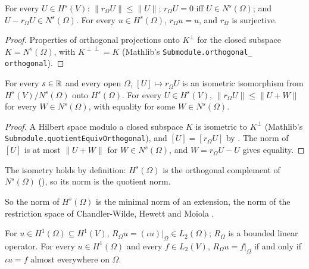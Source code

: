 \begin{lemma}
\label{lem:sobolev-restriction-basic}
\leanok
{}
For every $U \in H^s(V)$: $\|r_\Omega U\| \leq \|U\|$; $r_\Omega U = 0$ iff $U \in N^s(\Omega)$;
and $U - r_\Omega U \in N^s(\Omega)$. For every $u \in H^s(\Omega)$, $r_\Omega u = u$, and
$r_\Omega$ is surjective.
\end{lemma}

\begin{proof}
\leanok
Properties of orthogonal projections onto $K^\perp$ for the closed subspace $K = N^s(\Omega)$,
with $K^{\perp\perp} = K$ (Mathlib's \texttt{Submodule.\allowbreak orthogonal\_\allowbreak
orthogonal}).
\end{proof}

\begin{theorem}
\label{thm:sobolev-restriction-quotient}
\leanok
{}
For every $s \in \mathbb{R}$ and every open $\Omega$, $[U] \mapsto r_\Omega U$ is an isometric
isomorphism from $H^s(V) / N^s(\Omega)$ onto $H^s(\Omega)$. For every $U \in H^s(V)$,
$\|r_\Omega U\| \leq \|U + W\|$ for every $W \in N^s(\Omega)$, with equality for some
$W \in N^s(\Omega)$.
\end{theorem}

\begin{proof}
\leanok
A Hilbert space modulo a closed subspace $K$ is isometric to $K^\perp$ (Mathlib's
\texttt{Submodule.\allowbreak quotientEquivOrthogonal}), and $[U] = [r_\Omega U]$ by
. The norm of $[U]$ is at most $\|U + W\|$ for
$W \in N^s(\Omega)$, and $W = r_\Omega U - U$ gives equality.
\end{proof}

The isometry holds by definition: $H^s(\Omega)$ is the orthogonal complement of $N^s(\Omega)$
(), so its norm is the quotient norm.

So the norm of $H^s(\Omega)$ is the minimal norm of an extension, the norm of the restriction
space of Chandler-Wilde, Hewett and Moiola \cite[\S 3.1.4]{ChandlerWildeHewettMoiola}.

\begin{definition}
\label{def:sobolev-restriction-l2}
\leanok
{}
For $u \in H^1(\Omega) \subseteq H^1(V)$, $R_\Omega u = (\iota u)|_\Omega \in L_2(\Omega)$;
$R_\Omega$ is a bounded linear operator. For every $u \in H^1(\Omega)$ and every $f \in L_2(V)$,
$R_\Omega u = f|_\Omega$ if and only if $\iota u = f$ almost everywhere on $\Omega$.
\end{definition}

